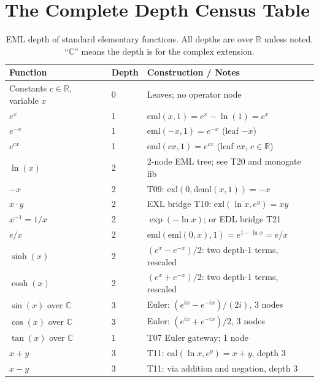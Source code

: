 \documentclass[12pt,a4paper]{article}
\theoremstyle{definition}
\theoremstyle{remark}
\begin{document}
\section{The Complete Depth Census Table}

\begin{table}[ht]
\centering
\caption{EML depth of standard elementary functions.
         All depths are over $\mathbb{R}$ unless noted.
         ``$\mathbb{C}$'' means the depth is for the complex extension.}
\label{tab:census}
\smallskip
\begin{tabular}{@{}llp{7cm}@{}}
\toprule
\textbf{Function} & \textbf{Depth} & \textbf{Construction / Notes} \\
\midrule
Constants $c\in\mathbb{R}$, variable $x$ & 0 & Leaves; no operator node \\
\midrule
$e^x$             & 1 & $\mathrm{eml}(x,1)=e^x-\ln(1)=e^x$ \\
$e^{-x}$          & 1 & $\mathrm{eml}(-x,1)=e^{-x}$ (leaf $-x$) \\
$e^{cx}$          & 1 & $\mathrm{eml}(cx,1)=e^{cx}$ (leaf $cx$, $c\in\mathbb{R}$) \\
\midrule
$\ln(x)$          & 2 & 2-node EML tree; see T20 and monogate lib \\
$-x$              & 2 & T09: $\mathrm{exl}(0,\mathrm{deml}(x,1))=-x$ \\
$x\cdot y$        & 2 & EXL bridge T10: $\mathrm{exl}(\ln x,e^y)=xy$ \\
$x^{-1}=1/x$      & 2 & $\exp(-\ln x)$; or EDL bridge T21 \\
$e/x$             & 2 & $\mathrm{eml}(\mathrm{eml}(0,x),1)=e^{1-\ln x}=e/x$ \\
$\sinh(x)$        & 2 & $(e^x-e^{-x})/2$: two depth-1 terms, rescaled \\
$\cosh(x)$        & 2 & $(e^x+e^{-x})/2$: two depth-1 terms, rescaled \\
\midrule
$\sin(x)$ over $\mathbb{C}$ & 3 & Euler: $(e^{ix}-e^{-ix})/(2i)$, 3 nodes \\
$\cos(x)$ over $\mathbb{C}$ & 3 & Euler: $(e^{ix}+e^{-ix})/2$, 3 nodes \\
$\tan(x)$ over $\mathbb{C}$ & 1 & T07 Euler gateway; 1 node \\
$x+y$             & 3 & T11: $\mathrm{eal}(\ln x,e^y)=x+y$, depth 3 \\
$x-y$             & 3 & T11: via addition and negation, depth 3 \\

\end{tabular}
\end{table}
\end{document}
